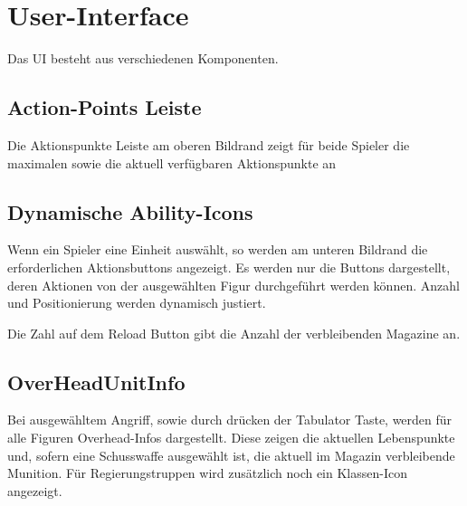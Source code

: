 \chapter{User-Interface}
Das UI besteht aus verschiedenen Komponenten.

\section{Action-Points Leiste}
Die Aktionspunkte Leiste am oberen Bildrand zeigt für beide Spieler die maximalen sowie die aktuell verfügbaren Aktionspunkte an

\section{Dynamische Ability-Icons}
Wenn ein Spieler eine Einheit auswählt, so werden am unteren Bildrand die erforderlichen Aktionsbuttons angezeigt. Es werden nur die Buttons dargestellt, deren Aktionen von der ausgewählten Figur durchgeführt werden können. Anzahl und Positionierung werden dynamisch justiert. 

Die Zahl auf dem Reload Button gibt die Anzahl der verbleibenden Magazine an.

\section{OverHeadUnitInfo}
Bei ausgewähltem Angriff, sowie durch drücken der Tabulator Taste, werden für alle Figuren Overhead-Infos dargestellt. Diese zeigen die aktuellen Lebenspunkte und, sofern eine Schusswaffe ausgewählt ist, die aktuell im Magazin verbleibende Munition. Für Regierungstruppen wird zusätzlich noch ein Klassen-Icon angezeigt.

